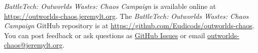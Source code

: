 \emph{BattleTech: Outworlds Wastes: Chaos Campaign} is available online at \href{https://outworlds-chaos.jeremylt.org}{https://outworlds-chaos.jeremylt.org}.
The \emph{BattleTech: Outworlds Wastes: Chaos Campaign} GitHub repository is at \href{https://github.com/Eudicods/outworlds-chaos}{https://github.com/Eudicods/outworlds-chaos}.
You can post feedback or ask questions as \href{https://github.com/Eudicods/outworlds-chaos/issues}{GitHub Issues} or email \href{mailto:outworlds-chaos@jeremylt.org}{outworlds-chaos@jeremylt.org}.
